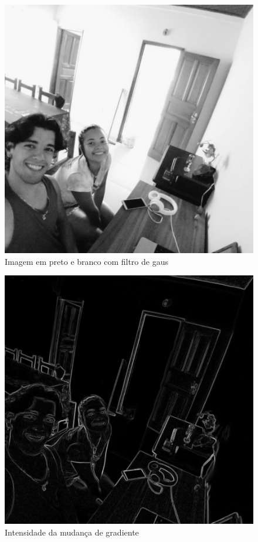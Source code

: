 \begin{figure}[!htb]
	\centering
	\includegraphics[scale=0.25]{figuras/filter/sobel/f_normal.jpeg}
	\caption{Imagem em preto e branco com filtro de gaus}
	\label{fig:Imagem em preto e branco com filtro de gaus}
\end{figure}

\begin{figure}[!htb]
	\centering
	\includegraphics[scale=0.25]{figuras/filter/sobel/f_sobel.jpeg}
	\caption{Intensidade da mudança de gradiente}
	\label{fig:Intensidade da mudanca de gradiente}
\end{figure}

